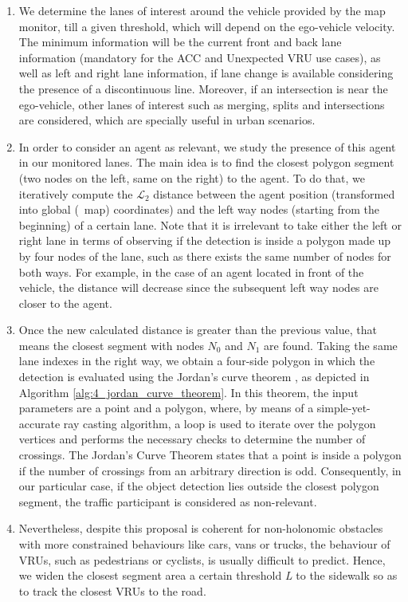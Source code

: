 \begin{enumerate}
	
	\item We determine the lanes of interest around the vehicle provided by the map monitor, till a given threshold, which will depend on the ego-vehicle velocity. The minimum information will be the current front and back lane information (mandatory for the \ac{ACC} and Unexpected \ac{VRU} use cases), as well as left and right lane information, if lane change is available considering the presence of a discontinuous line. Moreover, if an intersection is near the ego-vehicle, other lanes of interest such as merging, splits and intersections are considered, which are specially useful in urban scenarios.%
	
	\item In order to consider an agent as relevant, we study the presence of this agent in our monitored lanes. The main idea is to find the closest polygon segment (two nodes on the left, same on the right) to the agent. To do that, we iteratively compute the $\mathcal{L}_2$ distance between the agent position (transformed into global (\aka \ map) coordinates) and the left way nodes (starting from the beginning) of a certain lane. Note that it is irrelevant to take either the left or right lane in terms of observing if the detection is inside a polygon made up by four nodes of the lane, such as there exists the same number of nodes for both ways. For example, in the case of an agent located in front of the vehicle, the distance will decrease since the subsequent left way nodes are closer to the agent. 
	
	\item Once the new calculated distance is greater than the previous value, that means the closest segment with nodes \textit{$N_0$} and \textit{$N_1$} are found. Taking the same lane indexes in the right way, we obtain a four-side polygon in which the detection is evaluated using the Jordan's curve theorem \cite{tverberg1980proof}, as depicted in Algorithm \ref{alg:4_jordan_curve_theorem}. In this theorem, the input parameters are a point and a polygon, where, by means of a simple-yet-accurate ray casting algorithm, a loop is used to iterate over the polygon vertices and performs the necessary checks to determine the number of crossings. The Jordan's Curve Theorem states that a point is inside a polygon if the number of crossings from an arbitrary direction is odd. Consequently, in our particular case, if the object detection lies outside the closest polygon segment, the traffic participant is considered as non-relevant.
	
	\item Nevertheless, despite this proposal is coherent for non-holonomic obstacles with more constrained behaviours like cars, vans or trucks, the behaviour of \acp{VRU}, such as pedestrians or cyclists, is usually difficult to predict. Hence, we widen the closest segment area a certain threshold \textit{L} to the sidewalk so as to track the closest \acp{VRU} to the road.
	
\end{enumerate}

